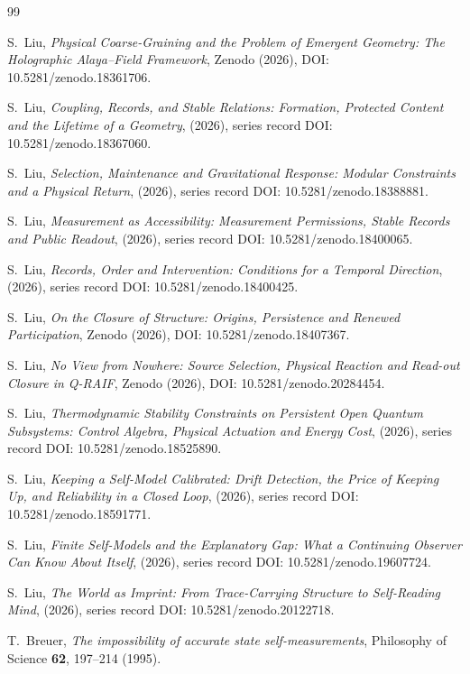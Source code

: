 \documentclass[12pt,a4paper]{article}
\begin{document}
\begin{thebibliography}{99}

S.~Liu, \emph{Physical Coarse-Graining and the Problem of Emergent Geometry: The Holographic Alaya--Field Framework}, Zenodo (2026), DOI: 10.5281/zenodo.18361706.

S.~Liu, \emph{Coupling, Records, and Stable Relations: Formation, Protected Content and the Lifetime of a Geometry}, (2026), series record DOI: 10.5281/zenodo.18367060.

S.~Liu, \emph{Selection, Maintenance and Gravitational Response: Modular Constraints and a Physical Return}, (2026), series record DOI: 10.5281/zenodo.18388881.

S.~Liu, \emph{Measurement as Accessibility: Measurement Permissions, Stable Records and Public Readout}, (2026), series record DOI: 10.5281/zenodo.18400065.

S.~Liu, \emph{Records, Order and Intervention: Conditions for a Temporal Direction}, (2026), series record DOI: 10.5281/zenodo.18400425.

S.~Liu, \emph{On the Closure of Structure: Origins, Persistence and Renewed Participation}, Zenodo (2026), DOI: 10.5281/zenodo.18407367.

S.~Liu, \emph{No View from Nowhere: Source Selection, Physical Reaction and Read-out Closure in Q-RAIF}, Zenodo (2026), DOI: 10.5281/zenodo.20284454.

S.~Liu, \emph{Thermodynamic Stability Constraints on Persistent Open Quantum Subsystems: Control Algebra, Physical Actuation and Energy Cost}, (2026), series record DOI: 10.5281/zenodo.18525890.

S.~Liu, \emph{Keeping a Self-Model Calibrated: Drift Detection, the Price of Keeping Up, and Reliability in a Closed Loop}, (2026), series record DOI: 10.5281/zenodo.18591771.

S.~Liu, \emph{Finite Self-Models and the Explanatory Gap: What a Continuing Observer Can Know About Itself}, (2026), series record DOI: 10.5281/zenodo.19607724.

S.~Liu, \emph{The World as Imprint: From Trace-Carrying Structure to Self-Reading Mind}, (2026), series record DOI: 10.5281/zenodo.20122718.

T.~Breuer, \emph{The impossibility of accurate state self-measurements}, Philosophy of Science \textbf{62}, 197--214 (1995).


\end{thebibliography}
\end{document}

